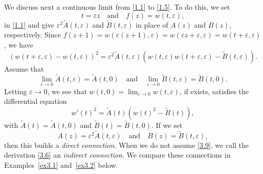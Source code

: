 \documentclass{amsart}
\begin{document}
We discuss next a continuous limit from \eqref{1.1} to \eqref{1.5}. To do this, we set
\begin{equation}
t=\varepsilon z\quad \text{and}\quad f(z)=w(t,\varepsilon),\label{3.5}
\end{equation}
in \eqref{1.1} and give $\varepsilon^2 \tilde A(t,\varepsilon)$ and $\tilde{B}(t,\varepsilon)$
in place of $A(z)$ and $B(z)$, respectively.
Since $f(z+1)=w(\varepsilon(z+1),\varepsilon)=w(\varepsilon z+\varepsilon,\varepsilon)= w(t+\varepsilon,\varepsilon)$, we have
\begin{equation}
(w(t+\varepsilon,\varepsilon)-w(t,\varepsilon))^2=\varepsilon^2\tilde{A}(t,\varepsilon)(w(t,\varepsilon)w(t+\varepsilon,\varepsilon)-\tilde{B}(t,\varepsilon)).\label{3.6}
\end{equation}
Assume that
\begin{equation}
\lim_{\varepsilon\to0}\tilde{A}(t,\varepsilon)=\tilde{A}(t,0)\quad\text{and}\quad \lim_{\varepsilon\to0}\tilde{B}(t,\varepsilon)=\tilde{B}(t,0).\label{3.7}
\end{equation}
Letting $\varepsilon\to0$, we see that $\displaystyle w(t,0)=\lim_{\varepsilon\to0}w(t,\varepsilon)$, if exists, satisfies the differential equation
\begin{equation}
w'(t)^2=\tilde A(t)(w(t)^2-\tilde B(t)),\label{3.8}
 \end{equation}
with $\tilde A(t)=\tilde A(t,0)$ and $\tilde B(t)=\tilde B(t,0)$.
If we set
\begin{equation}
A(z)=\varepsilon^2 \tilde A(t,\varepsilon)\quad \text{and}\quad B(z)=\tilde{B}(t,\varepsilon),\label{3.9}
\end{equation}
then this builds a \textit{direct connection}. When we do not assume \eqref{3.9}, we call the derivation
\eqref{3.6} an \textit{indirect connection}. We compare these connections in Examples~\ref{ex3.1} and~\ref{ex3.2} below.
\end{document}
